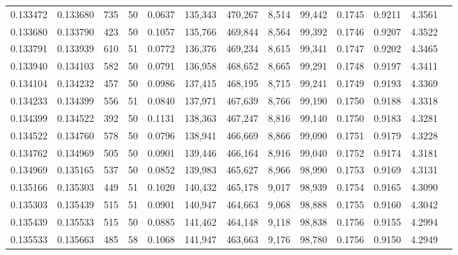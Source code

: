 \begin{tabular}{rrrrrrrrrrrrr}
0.133472 & 0.133680 &   735 &  50 &                                     0.0637 & 135,343 & 470,267 &   8,514 &  99,442 & 0.1745 & 0.9211 & 4.3561 \\
0.133680 & 0.133790 &   423 &  50 &                                     0.1057 & 135,766 & 469,844 &   8,564 &  99,392 & 0.1746 & 0.9207 & 4.3522 \\
0.133791 & 0.133939 &   610 &  51 &                                     0.0772 & 136,376 & 469,234 &   8,615 &  99,341 & 0.1747 & 0.9202 & 4.3465 \\
0.133940 & 0.134103 &   582 &  50 &                                     0.0791 & 136,958 & 468,652 &   8,665 &  99,291 & 0.1748 & 0.9197 & 4.3411 \\
0.134104 & 0.134232 &   457 &  50 &                                     0.0986 & 137,415 & 468,195 &   8,715 &  99,241 & 0.1749 & 0.9193 & 4.3369 \\
0.134233 & 0.134399 &   556 &  51 &                                     0.0840 & 137,971 & 467,639 &   8,766 &  99,190 & 0.1750 & 0.9188 & 4.3318 \\
0.134399 & 0.134522 &   392 &  50 &                                     0.1131 & 138,363 & 467,247 &   8,816 &  99,140 & 0.1750 & 0.9183 & 4.3281 \\
0.134522 & 0.134760 &   578 &  50 &                                     0.0796 & 138,941 & 466,669 &   8,866 &  99,090 & 0.1751 & 0.9179 & 4.3228 \\
0.134762 & 0.134969 &   505 &  50 &                                     0.0901 & 139,446 & 466,164 &   8,916 &  99,040 & 0.1752 & 0.9174 & 4.3181 \\
0.134969 & 0.135165 &   537 &  50 &                                     0.0852 & 139,983 & 465,627 &   8,966 &  98,990 & 0.1753 & 0.9169 & 4.3131 \\
0.135166 & 0.135303 &   449 &  51 &                                     0.1020 & 140,432 & 465,178 &   9,017 &  98,939 & 0.1754 & 0.9165 & 4.3090 \\
0.135303 & 0.135439 &   515 &  51 &                                     0.0901 & 140,947 & 464,663 &   9,068 &  98,888 & 0.1755 & 0.9160 & 4.3042 \\
0.135439 & 0.135533 &   515 &  50 &                                     0.0885 & 141,462 & 464,148 &   9,118 &  98,838 & 0.1756 & 0.9155 & 4.2994 \\
0.135533 & 0.135663 &   485 &  58 &                                     0.1068 & 141,947 & 463,663 &   9,176 &  98,780 & 0.1756 & 0.9150 & 4.2949 \\

\end{tabular}
